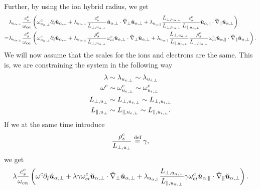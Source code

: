 %
Further, by using the ion hybrid radius, we get
%
\begin{align*}
    &
 \lambda_{u_{\alpha,\perp}}
 \frac{c^c_s}{\omega_{c\alpha}}
 \left(
 \omega^c_{u_{\alpha,\perp}}
 \partial_{\breve{t}} \breve{\boldsymbol{u}}_{\alpha,\perp}
 +
 \lambda_{u_{\alpha,\perp}}
 \frac{ c^c_s }{L_{\perp, u_{\alpha,\perp}}}
 \breve{\boldsymbol{u}}_{\alpha,\perp}\cdot\breve{\nabla}_\perp\breve{\boldsymbol{u}}_{\alpha,\perp}
 +
 \lambda_{u_{\alpha,\|}}
 \frac{L_{\perp, u_{\alpha,\perp}}}{L_{\perp, u_{\alpha,\perp}}}
 \frac{c^c_s}{L_{\|, u_{\alpha,\perp}}}
 \breve{\boldsymbol{u}}_{\alpha,\|}\cdot\breve{\nabla}_\|\breve{\boldsymbol{u}}_{\alpha,\perp}
 \right)
 \\
 =&
 \lambda_{u_{\alpha,\perp}}
 \frac{c^c_s}{\omega_{c\alpha}}
 \left(
 \omega^c_{u_{\alpha,\perp}}
 \partial_{\breve{t}} \breve{\boldsymbol{u}}_{\alpha,\perp}
 +
 \lambda_{u_{\alpha,\perp}}
 \frac{ \rho^c_s }{L_{\perp, u_{\alpha,\perp}}}
 \omega^c_{ci}
 \breve{\boldsymbol{u}}_{\alpha,\perp}\cdot\breve{\nabla}_\perp\breve{\boldsymbol{u}}_{\alpha,\perp}
 +
 \lambda_{u_{\alpha,\|}}
 \frac{L_{\perp, u_{\alpha,\perp}}}{L_{\|, u_{\alpha,\perp}}}
 \frac{\rho^c_s}{L_{\perp, u_{\alpha,\perp}}}
 \omega^c_{ci}
 \breve{\boldsymbol{u}}_{\alpha,\|}\cdot\breve{\nabla}_\|\breve{\boldsymbol{u}}_{\alpha,\perp}
 \right).
\end{align*}
%
We will now assume that the scales for the ions and electrons are the same.
This is, we are constraining the system in the following way
%
\begin{align*}
    \lambda              &\sim \lambda_{u_{e,\perp}}  \sim \lambda_{u_{i,\perp}} \\
    \omega^c                &\sim \omega^c_{u_{e,\perp}}    \sim \omega^c_{u_{i,\perp}}   \\
    L_{\perp, u_{\perp}} &\sim L_{\perp, u_{e,\perp}} \sim L_{\perp, u_{i,\perp}}\\
    L_{\|, u_{\perp}}    &\sim L_{\|, u_{e,\perp}}    \sim L_{\|, u_{i,\perp}}.
\end{align*}
%
If we at the same time introduce
%
\begin{align*}
    \frac{ \rho^c_s }{L_{\perp, u_{\perp}}} \overset{\text{def}}{=} \gamma,
\end{align*}
%
we get
%
\begin{align}
 \lambda
 \frac{c^c_s}{\omega_{c\alpha}}
 \left(
 \omega^c
 \partial_{\breve{t}} \breve{\boldsymbol{u}}_{\alpha,\perp}
 +
 \lambda
 \gamma
 \omega^c_{ci}
 \breve{\boldsymbol{u}}_{\alpha,\perp}\cdot\breve{\nabla}_\perp\breve{\boldsymbol{u}}_{\alpha,\perp}
 +
 \lambda_{u_{\alpha,\|}}
 \frac{L_{\perp, u_{\alpha,\perp}}}{L_{\|, u_{\alpha,\perp}}}
 \gamma
 \omega^c_{ci}
 \breve{\boldsymbol{u}}_{\alpha,\|}\cdot\breve{\nabla}_\|\breve{\boldsymbol{u}}_{\alpha,\perp}
 \right).
 \label{eq:doLHSAfterFirstConstraint}
\end{align}
